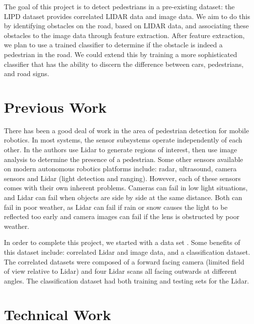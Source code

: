 \documentclass[10pt,twocolumn,letterpaper]{article}
\begin{document}
  The goal of this project is to detect pedestrians in a pre-existing dataset: 
  the LIPD dataset provides correlated LIDAR data and image data. We aim to do
  this by identifying obstacles on the road, based on LIDAR data, and
  associating these obstacles to the image data through feature extraction.
  After feature extraction, we plan to use a trained classifier to determine
  if the obstacle is indeed a pedestrian in the road. We could extend this by 
  training a more sophisticated classifier that has the ability to discern the 
  difference between cars, pedestrians, and road signs.

\section{Previous Work}

  There has been a good deal of work in the area of pedestrian detection for 
  mobile robotics. In most systems, the sensor subsystems operate independently
  of each other. In \cite{journal} the authors use Lidar to generate regions
  of interest, then use image analysis to determine the presence of a 
  pedestrian. Some other sensors available on modern autonomous robotics 
  platforms include: radar, ultrasound, camera sensors and Lidar (light
  detection and ranging). However, each of these sensors comes with their own
  inherent problems. Cameras can fail in low light situations, and Lidar can
  fail when objects are side by side at the same distance. Both can fail in poor
  weather, as Lidar can fail if rain or snow causes the light to be reflected
  too early and camera images can fail if the lens is obstructed by poor weather.

  In order to complete this project, we started with a data set \cite{dataset}.
  Some benefits of this dataset include: correlated Lidar and image data, and 
  a classification dataset. The correlated datasets were composed of a forward
  facing camera (limited field of view relative to Lidar) and four Lidar scans
  all facing outwards at different angles. The classification dataset had both
  training and testing sets for the Lidar.


\section{Technical Work}
\end{document}

